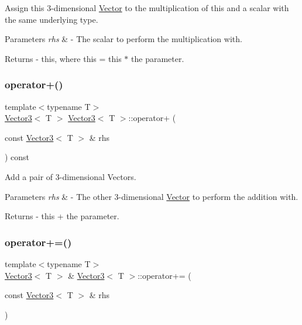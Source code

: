 Assign this 3-\/dimensional \mbox{\hyperlink{class_vector}{Vector}} to the multiplication of this and a scalar with the same underlying type. 
\begin{DoxyParams}{Parameters}
{\em rhs} & -\/ The scalar to perform the multiplication with. \\
\hline
\end{DoxyParams}
\begin{DoxyReturn}{Returns}
-\/ this, where \textquotesingle{}this = this $\ast$ the parameter\textquotesingle{}. 
\end{DoxyReturn}
\mbox{\label{class_vector3_ae773f6324d5ee80b042632297e573400}} 
\subsubsection{\texorpdfstring{operator+()}{operator+()}}
{\footnotesize\ttfamily template$<$typename T$>$ \\
\mbox{\hyperlink{class_vector3}{Vector3}}$<$ T $>$ \mbox{\hyperlink{class_vector3}{Vector3}}$<$ T $>$\+::operator+ (\begin{DoxyParamCaption}\item[{const \mbox{\hyperlink{class_vector3}{Vector3}}$<$ T $>$ \&}]{rhs }\end{DoxyParamCaption}) const}

Add a pair of 3-\/dimensional Vectors. 
\begin{DoxyParams}{Parameters}
{\em rhs} & -\/ The other 3-\/dimensional \mbox{\hyperlink{class_vector}{Vector}} to perform the addition with. \\
\hline
\end{DoxyParams}
\begin{DoxyReturn}{Returns}
-\/ this + the parameter. 
\end{DoxyReturn}
\mbox{\label{class_vector3_a46410fa08aa469fe979bc29601ee18f0}} 
\subsubsection{\texorpdfstring{operator+=()}{operator+=()}}
{\footnotesize\ttfamily template$<$typename T$>$ \\
\mbox{\hyperlink{class_vector3}{Vector3}}$<$ T $>$ \& \mbox{\hyperlink{class_vector3}{Vector3}}$<$ T $>$\+::operator+= (\begin{DoxyParamCaption}\item[{const \mbox{\hyperlink{class_vector3}{Vector3}}$<$ T $>$ \&}]{rhs }\end{DoxyParamCaption})}


